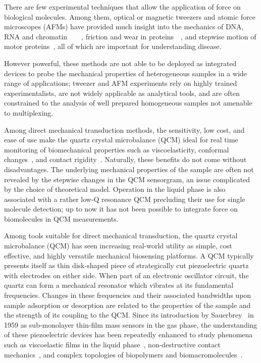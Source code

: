There are few experimental techniques that allow the application of force
on biological molecules. Among them, optical or magnetic tweezers and
atomic force microscopes (AFMs) have provided much insight into the
mechanics of DNA, RNA and
chromatin~\cite{felsenfeld1992chromatin}~\cite{cui2000pulling}~\cite{larson2012trigger}~\cite{marko1995stretching},
friction and wear in
proteins~\cite{suda2001origin}~\cite{bormuth2009protein}, and stepwise
motion of motor proteins~\cite{asbury2003kinesin}, all of which are
important for understanding disease.

However powerful, these methods are not able to be deployed as integrated
devices to probe the mechanical properties of heterogeneous samples in a
wide range of applications; tweezer and AFM experiments rely on highly
trained experimentalists, are not widely applicable as analytical tools,
and are often constrained to the analysis of well prepared homogeneous
samples not amenable to multiplexing.

Among direct mechanical transduction methods, the sensitivity, low cost,
and ease of use make the quartz crystal microbalance (QCM) ideal for real
time monitoring of biomechanical properties such as viscoelasticity,
conformal changes~\cite{fant2000adsorption}, and contact
rigidity~\cite{cooper2007survey}.  Naturally, these benefits
do not come without disadvantages. The underlying mechanical properties of
the sample are often not revealed by the stepwise changes in the QCM
sensorgram, an issue complicated by the choice of theoretical model.
Operation in the liquid phase is also associated with a rather low-Q
resonance QCM precluding their use for single molecule detection; up to now
it has not been possible to integrate force on biomolecules in QCM
measurements.

Among tools suitable for direct mechanical transduction, the quartz crystal
microbalance (QCM) has seen increasing real-world utility as simple, cost
effective, and highly versatile mechanical biosensing platforms. A QCM
typically presents itself as thin disk-shaped piece of strategically cut
piezoelectric quartz with electrodes on either side. When part of an
electronic oscillator circuit, the quartz can form a mechanical resonator
which vibrates at its fundamental frequencies. Changes in these frequencies
and their associated bandwidths upon sample adsorption or desorption are
related to the properties of the sample and the strength of its coupling to
the QCM. Since its introduction by Sauerbrey~\cite{sauerbrey1959verwendung}
in 1959 as sub-monolayer thin-film mass sensors in the gas phase, the
understanding of these piezoelectric devices has been repeatedly enhanced
to study phenomena such as viscoelastic films in the liquid
phase~\cite{kanazawa1985frequency}, non-destructive contact
mechanics~\cite{johannsman2007contacts}, and complex topologies of
biopolymers and biomacromolecules~\cite{marx2003quartz}. 

